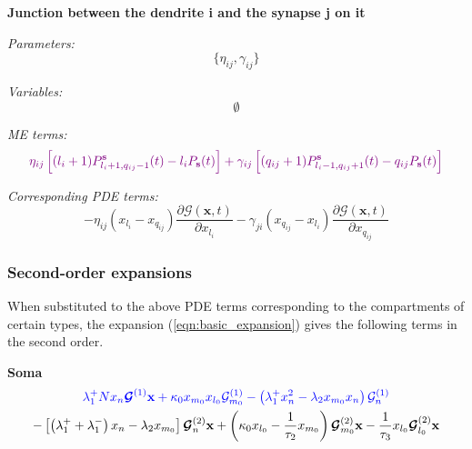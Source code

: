 \documentclass[a4paper, 11pt]{article}
\begin{document}
              {\bf Junction between the dendrite i and the synapse j on it}
              
              {\it Parameters:}
              \begin{equation*}
                \{\eta_{ij}, \gamma_{ij}\}
              \end{equation*}

              {\it Variables:}
              \begin{equation*}
                \emptyset
              \end{equation*}

              {\it ME terms:}
              \begin{equation}
                \begin{split}
                  \textcolor{violet}{\eta_{ij}\left[(l_i+1)P_{l_i+1, q_{ij}-1}^{\mathbf s}(t) - l_iP_{\mathbf s}(t)\right] + \gamma_{ij}\left[(q_{ij}+1)P_{l_i-1, q_{ij}+1}^{\mathbf s}(t) - q_{ij}P_{\mathbf s}(t)\right]}
                \end{split}
              \end{equation}
              
              {\it Corresponding PDE terms:}
              \begin{equation}
                -\eta_{ij}(x_{l_i}-x_{q_{ij}})\frac{\partial\mathcal G(\mathbf x, t)}{\partial x_{l_i}} - \gamma_{ji}(x_{q_{ij}}-x_{l_i})\frac{\partial\mathcal G(\mathbf x, t)}{\partial x_{q_{ij}}}
              \end{equation}
              
              \subsubsection{Second-order expansions} \label{subsubsec:2nd_order_expansions}
              When substituted to the above PDE terms corresponding to the compartments of certain types, the expansion (\ref{eqn:basic_expansion}) gives the following terms in the second order.
              
              {\bf Soma}
              \begin{multline*}
                \textcolor{blue}{\lambda_1^+Nx_n\boldsymbol{\mathcal G}^{(1)}\mathbf x + \kappa_0x_{m_0}x_{l_0}\mathcal G^{(1)}_{m_0} - \left(\lambda_1^+x_n^2-\lambda_2x_{m_0}x_n\right)\mathcal G_n^{(1)}}\\
                -\left[\left(\lambda_1^++\lambda_1^-\right)x_n-\lambda_2x_{m_0}\right]\boldsymbol{\mathcal G}_n^{(2)}\mathbf x + \left(\kappa_0x_{l_0}-\frac{1}{\tau_2}x_{m_0}\right)\boldsymbol{\mathcal G}_{m_0}^{(2)}\mathbf x - \frac{1}{\tau_3}x_{l_0}\boldsymbol{\mathcal G}^{(2)}_{l_0}\mathbf x
              \end{multline*}
              
\end{document}
